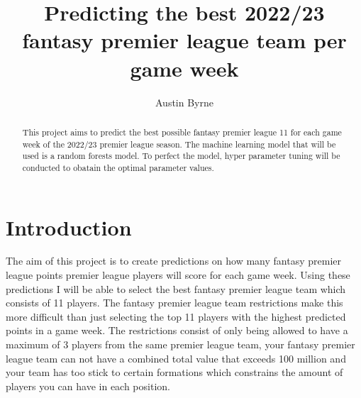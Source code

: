 \documentclass[11pt,preprint, authoryear]{elsarticle}
\numberwithin{equation}{section}
\numberwithin{figure}{section}
\numberwithin{table}{section}
\begin{document}
\begin{frontmatter}  %

\title{Predicting the best 2022/23 fantasy premier league team per game
week}





\author[Add1]{Austin Byrne}





\address[Add1]{Stellenbosch University, South Africa}


\begin{abstract}
\small{
This project aims to predict the best possible fantasy premier league 11
for each game week of the 2022/23 premier league season. The machine
learning model that will be used is a random forests model. To perfect
the model, hyper parameter tuning will be conducted to obatain the
optimal parameter values.
}
\end{abstract}

\vspace{1cm}





\vspace{0.5cm}

\end{frontmatter}

\setcounter{footnote}{0}


\renewcommand{\contentsname}{Table of Contents}
{\tableofcontents}

\pagestyle{fancy}
\chead{}
\rhead{}
\lfoot{}
\lhead{}
\cfoot{}


\headsep 35pt %




\hypertarget{introduction}{%
\section{\texorpdfstring{Introduction
\label{Introduction}}{Introduction }}\label{introduction}}

The aim of this project is to create predictions on how many fantasy
premier league points premier league players will score for each game
week. Using these predictions I will be able to select the best fantasy
premier league team which consists of 11 players. The fantasy premier
league team restrictions make this more difficult than just selecting
the top 11 players with the highest predicted points in a game week. The
restrictions consist of only being allowed to have a maximum of 3
players from the same premier league team, your fantasy premier league
team can not have a combined total value that exceeds 100 million and
your team has too stick to certain formations which constrains the
amount of players you can have in each position.
\end{document}
